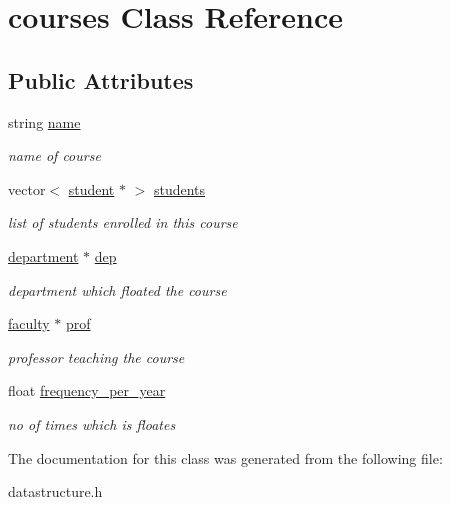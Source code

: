 \hypertarget{classcourses}{\section{courses \-Class \-Reference}
\label{classcourses}
}
\subsection*{\-Public \-Attributes}
\begin{DoxyCompactItemize}
\item 
\hypertarget{classcourses_a933d584ef485278bb79e59ecff1c82ad}{string \hyperlink{classcourses_a933d584ef485278bb79e59ecff1c82ad}{name}}\label{classcourses_a933d584ef485278bb79e59ecff1c82ad}

\begin{DoxyCompactList}\small\item\em name of course \end{DoxyCompactList}\item 
\hypertarget{classcourses_a2beadfe489902a382c90701894e919c0}{vector$<$ \hyperlink{classstudent}{student} $\ast$ $>$ \hyperlink{classcourses_a2beadfe489902a382c90701894e919c0}{students}}\label{classcourses_a2beadfe489902a382c90701894e919c0}

\begin{DoxyCompactList}\small\item\em list of students enrolled in this course \end{DoxyCompactList}\item 
\hypertarget{classcourses_a85afc7a3a5078151cc89f059fe4bac43}{\hyperlink{classdepartment}{department} $\ast$ \hyperlink{classcourses_a85afc7a3a5078151cc89f059fe4bac43}{dep}}\label{classcourses_a85afc7a3a5078151cc89f059fe4bac43}

\begin{DoxyCompactList}\small\item\em department which floated the course \end{DoxyCompactList}\item 
\hypertarget{classcourses_a7218f2b304187260490d13d6679f4272}{\hyperlink{classfaculty}{faculty} $\ast$ \hyperlink{classcourses_a7218f2b304187260490d13d6679f4272}{prof}}\label{classcourses_a7218f2b304187260490d13d6679f4272}

\begin{DoxyCompactList}\small\item\em professor teaching the course \end{DoxyCompactList}\item 
\hypertarget{classcourses_a420b42dd68e578d2ddf6668ea28f12fc}{float \hyperlink{classcourses_a420b42dd68e578d2ddf6668ea28f12fc}{frequency\-\_\-per\-\_\-year}}\label{classcourses_a420b42dd68e578d2ddf6668ea28f12fc}

\begin{DoxyCompactList}\small\item\em no of times which is floates \end{DoxyCompactList}\end{DoxyCompactItemize}


\-The documentation for this class was generated from the following file\-:\begin{DoxyCompactItemize}
\item 
datastructure.\-h\end{DoxyCompactItemize}
